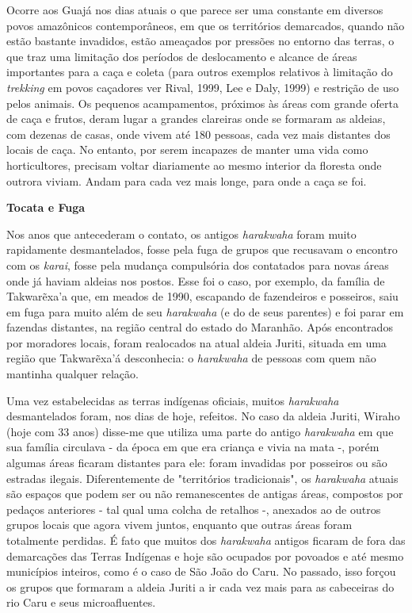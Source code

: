 Ocorre aos Guajá nos dias atuais o que parece ser uma constante em
diversos povos amazônicos contemporâneos, em que os territórios
demarcados, quando não estão bastante invadidos, estão ameaçados por
pressões no entorno das terras, o que traz uma limitação dos períodos de
deslocamento e alcance de áreas importantes para a caça e coleta (para
outros exemplos relativos à limitação do \emph{trekking} em povos
caçadores ver Rival, 1999, Lee e Daly, 1999) e restrição de uso pelos
animais. Os pequenos acampamentos, próximos às áreas com grande oferta
de caça e frutos, deram lugar a grandes clareiras onde se formaram as
aldeias, com dezenas de casas, onde vivem até 180 pessoas, cada vez mais
distantes dos locais de caça. No entanto, por serem incapazes de manter
uma vida como horticultores, precisam voltar diariamente ao mesmo
interior da floresta onde outrora viviam. Andam para cada vez mais
longe, para onde a caça se foi.

\textbf{Tocata e Fuga}

Nos anos que antecederam o contato, os antigos \emph{harakwaha} foram
muito rapidamente desmantelados, fosse pela fuga de grupos que recusavam
o encontro com os \emph{karai}, fosse pela mudança compulsória dos
contatados para novas áreas onde já haviam aldeias nos postos. Esse foi
o caso, por exemplo, da família de Takwarẽxa'a que, em meados de 1990,
escapando de fazendeiros e posseiros, saiu em fuga para muito além de
seu \emph{harakwaha} (e do de seus parentes) e foi parar em fazendas
distantes, na região central do estado do Maranhão. Após encontrados por
moradores locais, foram realocados na atual aldeia Juriti, situada em
uma região que Takwarẽxa'á desconhecia: o \emph{harakwaha} de pessoas
com quem não mantinha qualquer relação.

Uma vez estabelecidas as terras indígenas oficiais, muitos
\emph{harakwaha} desmantelados foram, nos dias de hoje, refeitos. No
caso da aldeia Juriti, Wiraho (hoje com 33 anos) disse-me que utiliza
uma parte do antigo \emph{harakwaha} em que sua família circulava - da
época em que era criança e vivia na mata -, porém algumas áreas ficaram
distantes para ele: foram invadidas por posseiros ou são estradas
ilegais. Diferentemente de "territórios tradicionais", os
\emph{harakwaha} atuais são espaços que podem ser ou não remanescentes
de antigas áreas, compostos por pedaços anteriores - tal qual uma colcha
de retalhos -, anexados ao de outros grupos locais que agora vivem
juntos, enquanto que outras áreas foram totalmente perdidas. É fato que
muitos dos \emph{harakwaha} antigos ficaram de fora das demarcações das
Terras Indígenas e hoje são ocupados por povoados e até mesmo municípios
inteiros, como é o caso de São João do Caru. No passado, isso forçou os
grupos que formaram a aldeia Juriti a ir cada vez mais para as
cabeceiras do rio Caru e seus microafluentes.

